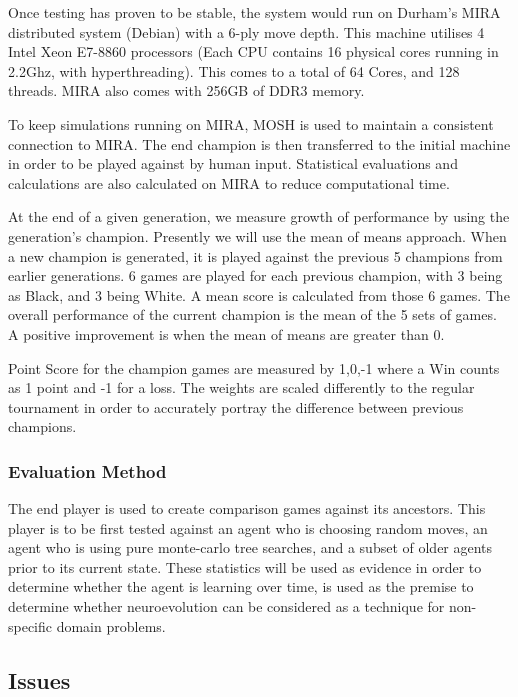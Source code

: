\documentclass[12pt,a4paper]{article}
\begin{document}
        Once testing has proven to be stable, the system would run on Durham's MIRA distributed system (Debian) with a 6-ply move depth. This machine utilises 4 Intel Xeon E7-8860 processors (Each CPU contains 16 physical cores running in 2.2Ghz, with hyperthreading). This comes to a total of 64 Cores, and 128 threads. MIRA also comes with 256GB of DDR3 memory. 
        
        To keep simulations running on MIRA, MOSH is used to maintain a consistent connection to MIRA. The end champion is then transferred to the initial machine in order to be played against by human input. Statistical evaluations and calculations are also calculated on MIRA to reduce computational time.

        At the end of a given generation, we measure growth of performance by using the generation's champion. Presently we will use the mean of means approach. When a new champion is generated, it is played against the previous 5 champions from earlier generations. 6 games are played for each previous champion, with 3 being as Black, and 3 being White. A mean score is calculated from those 6 games. The overall performance of the current champion is the mean of the 5 sets of games. A positive improvement is when the mean of means are greater than 0. 

        Point Score for the champion games are measured by {1,0,-1} where a Win counts as 1 point and -1 for a loss. The weights are scaled differently to the regular tournament in order to accurately portray the difference between previous champions.
    
        \subsubsection*{Evaluation Method}
    
        The end player is used to create comparison games against its ancestors. This player is to be first tested against an agent who is choosing random moves, an agent who is using pure monte-carlo tree searches, and a subset of older agents prior to its current state. These statistics will be used as evidence in order to determine whether the agent is learning over time, is used as the premise to determine whether neuroevolution can be considered as a technique for non-specific domain problems.
       
    \subsection{Issues}
       
\end{document}
